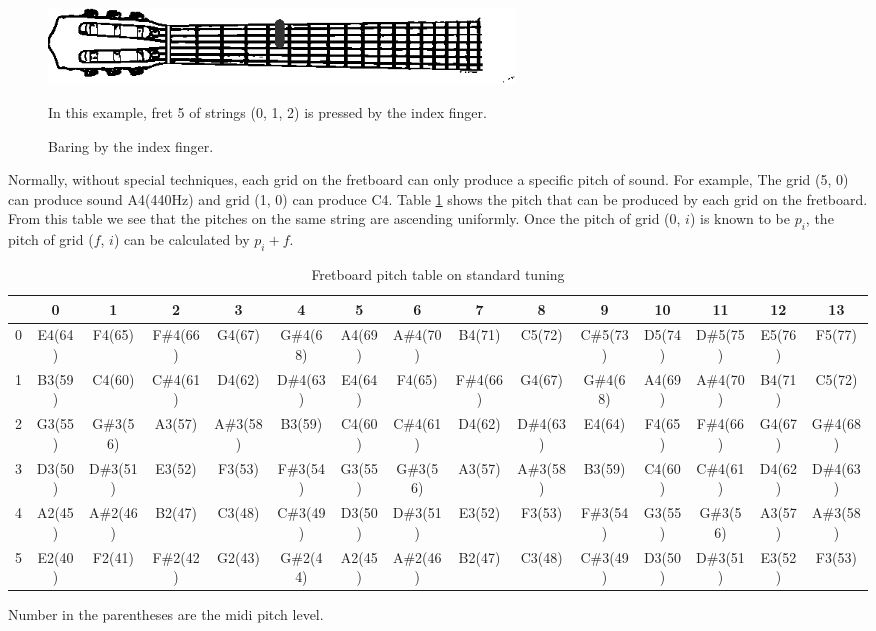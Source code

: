 \begin{figure}[h]
    \centering
    \includegraphics[width=0.6\textwidth]{Figures/fretboard-baring.eps}
    \caption{Baring by the index finger.}
    \label{fig:fretboard-baring}
    \startdescription
    In this example, fret 5 of strings (0, 1, 2) is pressed by the index finger.
\end{figure}

Normally, without special techniques, each grid on the fretboard can only produce a specific
pitch of sound. For example, The grid (5, 0) can produce sound A4(440Hz) and grid (1, 0) can produce C4. Table \ref{table:standard-tuning} shows the pitch that can be produced by each grid on the fretboard. From this table we see that the pitches on the same string are ascending uniformly. Once the pitch of grid (0, $i$) is known to be $p_i$, the pitch of grid ($f$, $i$) can be calculated by $p_i + f$.

\begin{table}
    \centering
    \tiny \tabcolsep=0.05cm
\begin{tabular*}{\textwidth}{r|c|c|c|c|c|c|c|c|c|c|c|c|c|c}
& 0& 1& 2& 3& 4& 5& 6& 7& 8& 9& 10& 11& 12& 13\\ \hline
0
& E4(64)& F4(65)& F\#4(66)& G4(67)& G\#4(68)& A4(69)& A\#4(70)& B4(71)& C5(72)& C\#5(73)& D5(74)& D\#5(75)& E5(76)& F5(77)\\ \hline
1
& B3(59)& C4(60)& C\#4(61)& D4(62)& D\#4(63)& E4(64)& F4(65)& F\#4(66)& G4(67)& G\#4(68)& A4(69)& A\#4(70)& B4(71)& C5(72)\\ \hline
2
& G3(55)& G\#3(56)& A3(57)& A\#3(58)& B3(59)& C4(60)& C\#4(61)& D4(62)& D\#4(63)& E4(64)& F4(65)& F\#4(66)& G4(67)& G\#4(68)\\ \hline
3
& D3(50)& D\#3(51)& E3(52)& F3(53)& F\#3(54)& G3(55)& G\#3(56)& A3(57)& A\#3(58)& B3(59)& C4(60)& C\#4(61)& D4(62)& D\#4(63)\\ \hline
4
& A2(45)& A\#2(46)& B2(47)& C3(48)& C\#3(49)& D3(50)& D\#3(51)& E3(52)& F3(53)& F\#3(54)& G3(55)& G\#3(56)& A3(57)& A\#3(58)\\ \hline
5
& E2(40)& F2(41)& F\#2(42)& G2(43)& G\#2(44)& A2(45)& A\#2(46)& B2(47)& C3(48)& C\#3(49)& D3(50)& D\#3(51)& E3(52)& F3(53)\\ \hline
\end{tabular*}
    \caption{Fretboard pitch table on standard tuning}
    \label{table:standard-tuning}
    \startdescription
    Number in the parentheses are the midi pitch level.
\end{table}

